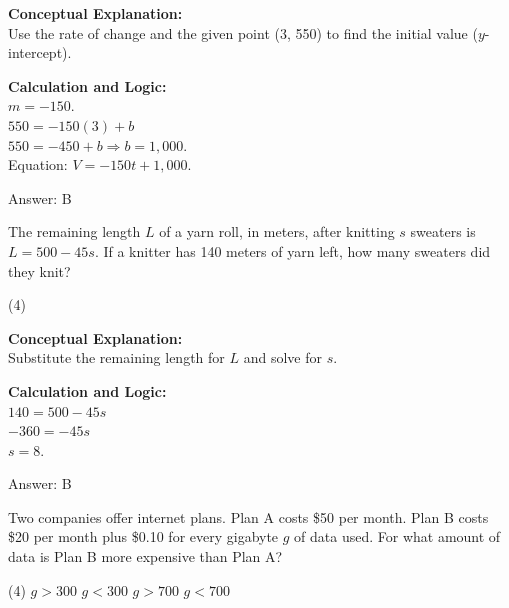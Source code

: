 \documentclass[11pt,paper=a4,answers]{exam}
\begin{document}
\begin{questions}
\begin{solution}
\textbf{Conceptual Explanation:} \\
Use the rate of change and the given point (3, 550) to find the initial value ($y$-intercept).

\vspace{10pt}
\textbf{Calculation and Logic:} \\
$m = -150$. \\
$550 = -150(3) + b$ \\
$550 = -450 + b \Rightarrow b = 1,000$. \\
Equation: $V = -150t + 1,000$.

\vspace{15pt}
Answer: \colorbox{yellow!100}{B}
\end{solution}

\vspace{20pt}

\question
The remaining length $L$ of a yarn roll, in meters, after knitting $s$ sweaters is $L = 500 - 45s$. If a knitter has 140 meters of yarn left, how many sweaters did they knit?
\begin{tasks}(4)
\end{tasks}

\begin{solution}
\textbf{Conceptual Explanation:} \\
Substitute the remaining length for $L$ and solve for $s$.

\vspace{10pt}
\textbf{Calculation and Logic:} \\
$140 = 500 - 45s$ \\
$-360 = -45s$ \\
$s = 8$.

\vspace{15pt}
Answer: \colorbox{yellow!100}{B}
\end{solution}

\vspace{20pt}

\question
Two companies offer internet plans. Plan A costs \$50 per month. Plan B costs \$20 per month plus \$0.10 for every gigabyte $g$ of data used. For what amount of data is Plan B more expensive than Plan A?
\begin{tasks}(4)
    \task $g > 300$
    \task $g < 300$
    \task $g > 700$
    \task $g < 700$
\end{tasks}


\end{questions}
\end{document}
